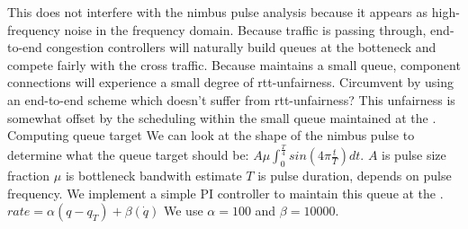 {\begin{outline}
        \3 This does not interfere with the nimbus pulse analysis because it appears as high-frequency noise in the frequency domain. 
        \3 Because traffic is passing through, end-to-end congestion controllers will naturally build queues at the botteneck and compete fairly with the cross traffic.
        \3 Because \inbox maintains a small queue, component connections will experience a small degree of rtt-unfairness.
            \4 Circumvent by using an end-to-end scheme which doesn't suffer from rtt-unfairness?
        \3 This unfairness is somewhat offset by the scheduling within the small queue maintained at the \inbox. 
\1 Computing \inbox queue target
    \2 We can look at the shape of the nimbus pulse to determine what the queue target should be: $A \mu \int_0^{\frac{T}{4}} sin(4 \pi \frac{t}{T}) dt$.
        \3 $A$ is pulse size fraction
        \3 $\mu$ is bottleneck bandwith estimate
        \3 $T$ is pulse duration, depends on pulse frequency.
\1 We implement a simple PI controller to maintain this queue at the \inbox.
    \2 $rate = \alpha (q - q_T) + \beta (\dot{q})$
        \3 We use $\alpha = 100$ and $\beta = 10000$.
    \2 
\end{outline}
}




